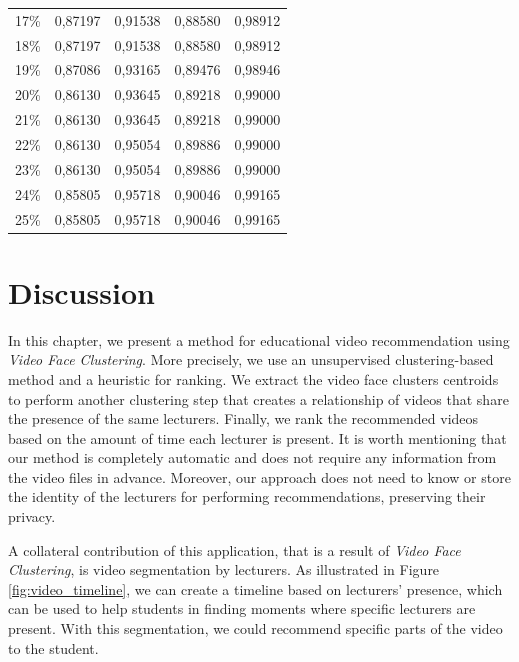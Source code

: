 \begin{table}[!ht]
\begin{tabular}{ccccc}
17\%               & 0,87197         & 0,91538        & 0,88580         & 0,98912   \\
18\%               & 0,87197         & 0,91538        & 0,88580         & 0,98912   \\
19\%               & 0,87086         & 0,93165        & 0,89476         & 0,98946   \\
20\%               & 0,86130         & 0,93645        & 0,89218         & 0,99000   \\
21\%               & 0,86130         & 0,93645        & 0,89218         & 0,99000   \\
22\%               & 0,86130         & 0,95054        & 0,89886         & 0,99000   \\
23\%               & 0,86130         & 0,95054        & 0,89886         & 0,99000   \\
24\%               & 0,85805         & 0,95718        & 0,90046         & 0,99165   \\
25\%               & 0,85805         & 0,95718        & 0,90046         & 0,99165  
\end{tabular}
\end{table}

\section{Discussion}
\label{sec:recommendation_discussion}

In this chapter, we present a method for educational video recommendation using \emph{Video Face Clustering}. More precisely, we use an unsupervised clustering-based method and a heuristic for ranking.
We extract the video face clusters centroids to perform another clustering step that creates a relationship of videos that share the presence of the same lecturers.
Finally, we rank the recommended videos based on the amount of time each lecturer is present.
It is worth mentioning that our method is completely automatic and does not require any information from the video files in advance.  
Moreover, our approach does not need to know or store the identity of the lecturers for performing recommendations, preserving their privacy.

A collateral contribution of this application, that is a result of \emph{Video Face Clustering}, is video segmentation by lecturers.
As illustrated in Figure \ref{fig:video_timeline}, we can create a timeline based on lecturers' presence, which can be used to help students in finding moments where specific lecturers are present.
With this segmentation, we could recommend specific parts of the video to the student.


